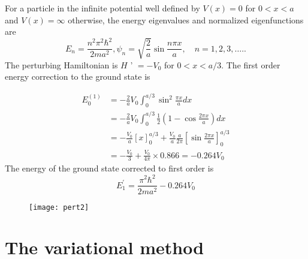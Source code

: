 \begin{answer}
For a particle in the infinite potential well defined by $V(x)=0$ for $0<x<a$ and $V(x)=\infty$ otherwise, the energy eigenvalues and normalized eigenfunctions are
$$
E_{n}=\frac{n^{2} \pi^{2} \hbar^{2}}{2 m a^{2}}, \psi_{n}=\sqrt{\frac{2}{a}} \sin \frac{n \pi x}{a}, \quad n=1,2,3, \ldots . .
$$
The perturbing Hamiltonian is $H$ ' $=-V_{0}$ for $0<x<a / 3$.
The first order energy correction to the ground state is\\
\begin{minipage}{0.5\textwidth}
$$
\begin{aligned}
E_{0}^{(1)} &=-\frac{2}{a} V_{0} \int_{0}^{a / 3} \sin ^{2} \frac{\pi x}{a} d x \\
&=-\frac{2}{a} V_{0} \int_{0}^{a / 3} \frac{1}{2}\left(1-\cos \frac{2 \pi x}{a}\right) d x \\
&=-\frac{V_{0}}{a}[x]_{0}^{a / 3}+\frac{V_{0}}{a} \frac{a}{2 \pi}\left[\sin \frac{2 \pi x}{a}\right]_{0}^{a / 3} \\
&=-\frac{V_{0}}{3}+\frac{V_{0}}{4 \pi} \times 0.866=-0.264 V_{0}
\end{aligned}
$$
The energy of the ground state corrected to first order is
$$
E_{1}^{\prime}=\frac{\pi^{2} \hbar^{2}}{2 m a^{2}}-0.264 V_{0}
$$	
\end{minipage}
\begin{minipage}{0.5\textwidth}
\begin{figure}[H]
	\centering
	\texttt{[image: pert2]}
	\caption{}
	\label{}
\end{figure}
\end{minipage}
\end{answer}
\section{The variational method}

